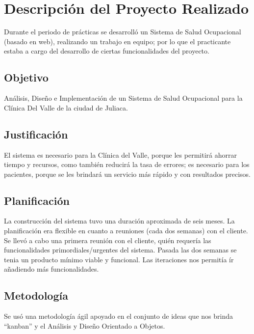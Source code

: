 \chapter{Descripción del Proyecto Realizado}
	Durante el periodo de prácticas se desarrolló un Sistema de Salud Ocupacional
	(basado en web), realizando un trabajo en equipo; por lo que el practicante
	estaba a cargo del desarrollo de ciertas funcionalidades del proyecto.
	
	\section{Objetivo}
		Análisis, Diseño e Implementación de un Sistema de Salud Ocupacional para la
		Clínica Del Valle de la ciudad de Juliaca.
		
	\section{Justificación}
		El sistema es necesario para la Clínica del Valle, porque les permitirá
		ahorrar tiempo y recursos, como también reducirá la tasa de errores; es necesario para
		los pacientes, porque se les brindará un servicio más rápido y con resultados
		precisos.
		
	\section{Planificación}
		La construcción del sistema tuvo una duración aproximada de seis meses. La
		planificación era flexible en cuanto a reuniones (cada dos semanas) con el
		cliente. Se llevó a cabo una primera reunión con el cliente, quién
		requería las funcionalidades primordiales/urgentes del sistema. Pasada las dos
		semanas se tenia un producto mínimo viable y funcional. Las iteraciones nos
		permitía ír añadiendo más funcionalidades.
		
	\section{Metodología}
		Se usó una metodología ágil apoyado en el conjunto de ideas que nos brinda
		``kanban'' y el Análisis y Diseño Orientado a Objetos.